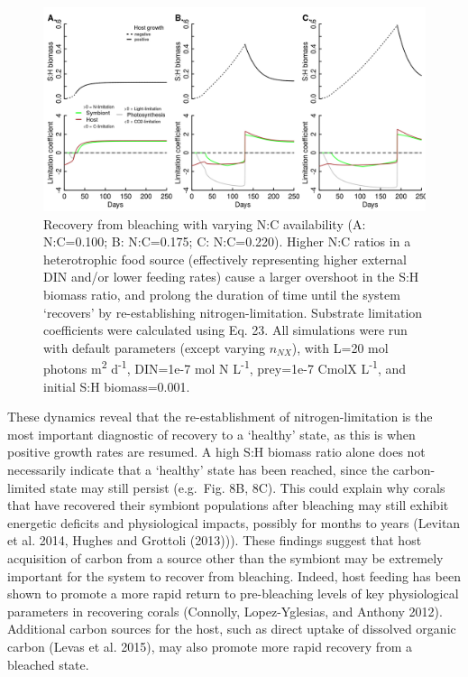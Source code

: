 \documentclass[]{elsarticle} %
\makeatletter
\def\maxwidth{\ifdim\Gin@nat@width>\linewidth\linewidth
\else\Gin@nat@width\fi}
\let\Oldincludegraphics\includegraphics
\renewcommand{\includegraphics}[1]{\Oldincludegraphics[width=\maxwidth]{#1}}
\makeatother
\begin{document}
\begin{figure}[htbp]
\centering
\includegraphics{../img/Fig9.png}
\caption{Recovery from bleaching with varying N:C availability (A:
N:C=0.100; B: N:C=0.175; C: N:C=0.220). Higher N:C ratios in a
heterotrophic food source (effectively representing higher external DIN
and/or lower feeding rates) cause a larger overshoot in the S:H biomass
ratio, and prolong the duration of time until the system `recovers' by
re-establishing nitrogen-limitation. Substrate limitation coefficients
were calculated using Eq. 23. All simulations were run with default
parameters (except varying \(n_{NX}\)), with L=20 mol photons
m\textsuperscript{2} d\textsuperscript{-1}, DIN=1e-7 mol N
L\textsuperscript{-1}, prey=1e-7 CmolX L\textsuperscript{-1}, and
initial S:H biomass=0.001.}
\end{figure}

These dynamics reveal that the re-establishment of nitrogen-limitation
is the most important diagnostic of recovery to a `healthy' state, as
this is when positive growth rates are resumed. A high S:H biomass ratio
alone does not necessarily indicate that a `healthy' state has been
reached, since the carbon-limited state may still persist (e.g.~Fig. 8B,
8C). This could explain why corals that have recovered their symbiont
populations after bleaching may still exhibit energetic deficits and
physiological impacts, possibly for months to years (Levitan et al.
2014, Hughes and Grottoli (2013))). These findings suggest that host
acquisition of carbon from a source other than the symbiont may be
extremely important for the system to recover from bleaching. Indeed,
host feeding has been shown to promote a more rapid return to
pre-bleaching levels of key physiological parameters in recovering
corals (Connolly, Lopez-Yglesias, and Anthony 2012). Additional carbon
sources for the host, such as direct uptake of dissolved organic carbon
(Levas et al. 2015), may also promote more rapid recovery from a
bleached state.
\end{document}
